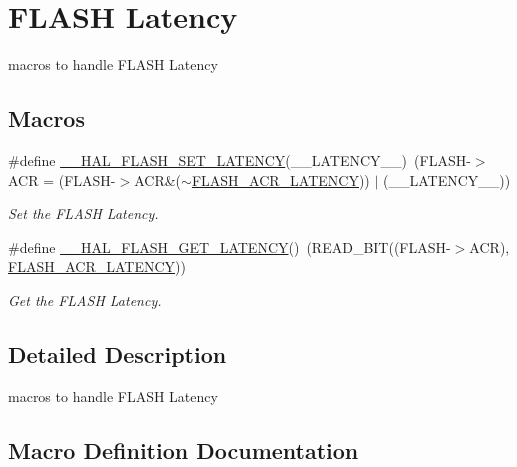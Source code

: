 \hypertarget{group___f_l_a_s_h___e_m___latency}{}\section{F\+L\+A\+SH Latency}
\label{group___f_l_a_s_h___e_m___latency}


macros to handle F\+L\+A\+SH Latency  


\subsection*{Macros}
\begin{DoxyCompactItemize}
\item 
\#define \hyperlink{group___f_l_a_s_h___e_m___latency_gac1c9f459b798cc3700b90a6245df5a1a}{\+\_\+\+\_\+\+H\+A\+L\+\_\+\+F\+L\+A\+S\+H\+\_\+\+S\+E\+T\+\_\+\+L\+A\+T\+E\+N\+CY}(\+\_\+\+\_\+\+L\+A\+T\+E\+N\+C\+Y\+\_\+\+\_\+)~(F\+L\+A\+SH-\/$>$A\+CR = (F\+L\+A\+SH-\/$>$A\+CR\&($\sim$\hyperlink{group___peripheral___registers___bits___definition_gaef5e44cbb084160a6004ca9951ec7318}{F\+L\+A\+S\+H\+\_\+\+A\+C\+R\+\_\+\+L\+A\+T\+E\+N\+CY})) $\vert$ (\+\_\+\+\_\+\+L\+A\+T\+E\+N\+C\+Y\+\_\+\+\_\+))
\begin{DoxyCompactList}\small\item\em Set the F\+L\+A\+SH Latency. \end{DoxyCompactList}\item 
\#define \hyperlink{group___f_l_a_s_h___e_m___latency_gaa537e44d74ce35ff5bfef80edf03f895}{\+\_\+\+\_\+\+H\+A\+L\+\_\+\+F\+L\+A\+S\+H\+\_\+\+G\+E\+T\+\_\+\+L\+A\+T\+E\+N\+CY}()~(R\+E\+A\+D\+\_\+\+B\+IT((F\+L\+A\+SH-\/$>$A\+CR), \hyperlink{group___peripheral___registers___bits___definition_gaef5e44cbb084160a6004ca9951ec7318}{F\+L\+A\+S\+H\+\_\+\+A\+C\+R\+\_\+\+L\+A\+T\+E\+N\+CY}))
\begin{DoxyCompactList}\small\item\em Get the F\+L\+A\+SH Latency. \end{DoxyCompactList}\end{DoxyCompactItemize}


\subsection{Detailed Description}
macros to handle F\+L\+A\+SH Latency 



\subsection{Macro Definition Documentation}
\mbox{\label{group___f_l_a_s_h___e_m___latency_gaa537e44d74ce35ff5bfef80edf03f895}} 
